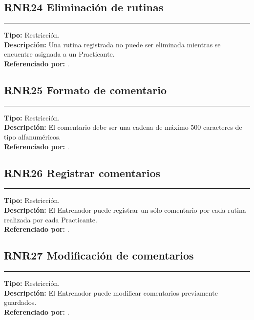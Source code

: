 \subsection{\normalsize{\textcolor[rgb]{0, 0, 0.545098}{RNR24 Eliminación de rutinas}}}
\label{rn:RNR24}
\rule[3mm]{16.59cm}{0.1mm} \vspace{1mm}
\textbf{Tipo:} Restricción.\\
\textbf{Descripción:} Una rutina registrada no puede ser eliminada mientras se encuentre asignada a un Practicante.\\
\textbf{Referenciado por: }  .\\

\subsection{\normalsize{\textcolor[rgb]{0, 0, 0.545098}{RNR25 Formato de comentario}}}
\label{rn:RNR25}
\rule[3mm]{16.59cm}{0.1mm} \vspace{1mm}
\textbf{Tipo:} Restricción.\\
\textbf{Descripción:} El comentario debe ser una cadena de máximo 500 caracteres de tipo alfanuméricos.\\
\textbf{Referenciado por: }  .\\

\subsection{\normalsize{\textcolor[rgb]{0, 0, 0.545098}{RNR26 Registrar comentarios}}}
\label{rn:RNR26}
\rule[3mm]{16.59cm}{0.1mm} \vspace{1mm}
\textbf{Tipo:} Restricción.\\
\textbf{Descripción:} El Entrenador puede registrar un sólo comentario por cada rutina realizada por cada Practicante.\\
\textbf{Referenciado por: }  .\\

\subsection{\normalsize{\textcolor[rgb]{0, 0, 0.545098}{RNR27 Modificación de comentarios}}}
\label{rn:RNR27}
\rule[3mm]{16.59cm}{0.1mm} \vspace{1mm}
\textbf{Tipo:} Restricción.\\
\textbf{Descripción:} El Entrenador puede modificar comentarios previamente guardados.\\
\textbf{Referenciado por: }  .\\

